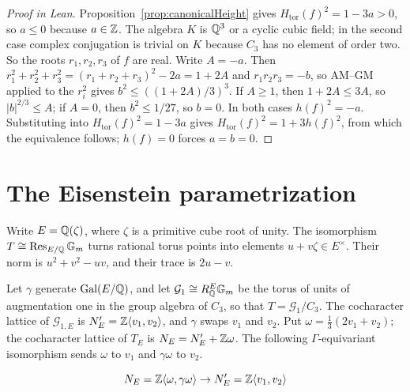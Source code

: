 \begin{proof}[Proof in Lean]

\leanok


Proposition~\ref{prop:canonicalHeight} gives $H_{\mathrm{tor}}(f)^2=1-3a>0$, so $a\leq0$ because $a\in\mathbb{Z}$. The algebra $K$ is $\mathbb{Q}^3$ or a cyclic cubic field; in the second case complex conjugation is trivial on $K$ because $C_3$ has no element of order two. So the roots $r_1,r_2,r_3$ of $f$ are real. Write $A=-a$. Then $r_1^2+r_2^2+r_3^2=(r_1+r_2+r_3)^2-2a=1+2A$ and $r_1r_2r_3=-b$, so AM--GM applied to the $r_i^2$ gives $b^2\leq((1+2A)/3)^3$. If $A\geq1$, then $1+2A\leq3A$, so $|b|^{2/3}\leq A$; if $A=0$, then $b^2\leq1/27$, so $b=0$. In both cases $h(f)^2=-a$. Substituting into $H_{\mathrm{tor}}(f)^2=1-3a$ gives $H_{\mathrm{tor}}(f)^2=1+3h(f)^2$, from which the equivalence follows; $h(f)=0$ forces $a=b=0$.

\end{proof}

\chapter{The Eisenstein parametrization}

\label{sec:quadraticParametrization}

Write $E=\mathbb{Q}(\zeta)$, where $\zeta$ is a primitive cube root of unity. The isomorphism $T\cong\operatorname{Res}_{E/\mathbb{Q}}\mathbb{G}_m$ turns rational torus points into elements $u+v\zeta\in E^\times$. Their norm is $u^2+v^2-uv$, and their trace is $2u-v$.

\begin{equationnode}

\label{eqn:isoCocharLattices}


\leanok

Let $\gamma$ generate $\mathrm{Gal}(E/\mathbb{Q})$, and let $\mathcal G_1\cong R^E_{\mathbb{Q}}\mathbb{G}_m$ be the torus of units of augmentation one in the group algebra of $C_3$, so that $T=\mathcal G_1/C_3$. The cocharacter lattice of $\mathcal G_{1,E}$ is $N_E'=\mathbb{Z}\langle v_1,v_2\rangle$, and $\gamma$ swaps $v_1$ and $v_2$. Put $\omega=\tfrac13(2v_1+v_2)$; the cocharacter lattice of $T_E$ is $N_E=N_E'+\mathbb{Z}\omega$. The following $\Gamma$-equivariant isomorphism sends $\omega$ to $v_1$ and $\gamma\omega$ to $v_2$.

\begin{equation*} N_E=\mathbb{Z}\langle\omega,\gamma\omega \rangle \to N_E'=\mathbb{Z}\langle v_1,v_2\rangle \end{equation*}

\end{equationnode}

